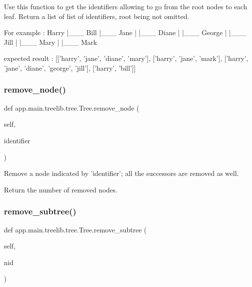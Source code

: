 \begin{DoxyVerb}Use this function to get the identifiers allowing to go from the root
nodes to each leaf.
Return a list of list of identifiers, root being not omitted.

For example :
    Harry
    |___ Bill
    |___ Jane
    |    |___ Diane
    |         |___ George
    |              |___ Jill
    |         |___ Mary
    |    |___ Mark

expected result :
[['harry', 'jane', 'diane', 'mary'],
 ['harry', 'jane', 'mark'],
 ['harry', 'jane', 'diane', 'george', 'jill'],
 ['harry', 'bill']]
\end{DoxyVerb}
 \mbox{\label{classapp_1_1main_1_1treelib_1_1tree_1_1Tree_ae560ce8ccbc05b3c7c70213606c64ae6}} 
\subsubsection{\texorpdfstring{remove\+\_\+node()}{remove\_node()}}
{\footnotesize\ttfamily def app.\+main.\+treelib.\+tree.\+Tree.\+remove\+\_\+node (\begin{DoxyParamCaption}\item[{}]{self,  }\item[{}]{identifier }\end{DoxyParamCaption})}

\begin{DoxyVerb}Remove a node indicated by 'identifier'; all the successors are
removed as well.

Return the number of removed nodes.
\end{DoxyVerb}
 \mbox{\label{classapp_1_1main_1_1treelib_1_1tree_1_1Tree_ad0f4edc203b3ea5d3bf5e77e2d8811e3}} 
\subsubsection{\texorpdfstring{remove\+\_\+subtree()}{remove\_subtree()}}
{\footnotesize\ttfamily def app.\+main.\+treelib.\+tree.\+Tree.\+remove\+\_\+subtree (\begin{DoxyParamCaption}\item[{}]{self,  }\item[{}]{nid }\end{DoxyParamCaption})}

